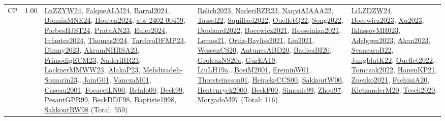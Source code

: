 {\begin{longtable}{p{3cm}r>{\raggedright\arraybackslash}p{6cm}>{\raggedright\arraybackslash}p{6cm}>{\raggedright\arraybackslash}p{8cm}}
\index{CP}\index{CP!CP}CP &  1.00 & \hyperref[detail:LuZZYW24]{LuZZYW24}, \hyperref[detail:FalqueALM24]{FalqueALM24}, \hyperref[detail:Barral2024]{Barral2024}, \hyperref[detail:BonninMNE24]{BonninMNE24}, \hyperref[detail:Houten2024]{Houten2024}, \hyperref[detail:abs-2402-00459]{abs-2402-00459}, \hyperref[detail:ForbesHJST24]{ForbesHJST24}, \hyperref[detail:PrataAN23]{PrataAN23}, \hyperref[detail:Euler2024]{Euler2024}, \hyperref[detail:Infantes2024]{Infantes2024}, \hyperref[detail:Thomas2024]{Thomas2024}, \hyperref[detail:TardivoDFMP23]{TardivoDFMP23}, \hyperref[detail:Dimny2023]{Dimny2023}, \hyperref[detail:AkramNHRSA23]{AkramNHRSA23}, \hyperref[detail:FrimodigECM23]{FrimodigECM23}, \hyperref[detail:NaderiRR23]{NaderiRR23}, \hyperref[detail:LacknerMMWW23]{LacknerMMWW23}, \hyperref[detail:AlakaP23]{AlakaP23}, \hyperref[detail:Mehdizadeh-Somarin23]{Mehdizadeh-Somarin23}...\hyperref[detail:JainG01]{JainG01}, \hyperref[detail:VanczaM01]{VanczaM01}, \hyperref[detail:Caseau2001]{Caseau2001}, \hyperref[detail:FocacciLN00]{FocacciLN00}, \hyperref[detail:Refalo00]{Refalo00}, \hyperref[detail:Beck99]{Beck99}, \hyperref[detail:PesantGPR99]{PesantGPR99}, \hyperref[detail:BeckDDF98]{BeckDDF98}, \hyperref[detail:Baptiste1998]{Baptiste1998}, \hyperref[detail:SakkoutRW98]{SakkoutRW98} (Total: 559) & \hyperref[detail:Relich2023]{Relich2023}, \hyperref[detail:NaderiBZR23]{NaderiBZR23}, \hyperref[detail:NaqviAIAAA22]{NaqviAIAAA22}, \hyperref[detail:Tassel22]{Tassel22}, \hyperref[detail:Squillaci2022]{Squillaci2022}, \hyperref[detail:OuelletQ22]{OuelletQ22}, \hyperref[detail:Song2022]{Song2022}, \hyperref[detail:Doolaard2022]{Doolaard2022}, \hyperref[detail:Bocewicz2021]{Bocewicz2021}, \hyperref[detail:Hosseinian2021]{Hosseinian2021}, \hyperref[detail:Lemos21]{Lemos21}, \hyperref[detail:Ortiz-Bayliss2021]{Ortiz-Bayliss2021}, \hyperref[detail:Liu2021]{Liu2021}, \hyperref[detail:WessenCS20]{WessenCS20}, \hyperref[detail:AntunesABD20]{AntunesABD20}, \hyperref[detail:BadicaBI20]{BadicaBI20}, \hyperref[detail:GroleazNS20a]{GroleazNS20a}, \hyperref[detail:GurEA19]{GurEA19}, \hyperref[detail:LiuLH19a]{LiuLH19a}...\hyperref[detail:BosiM2001]{BosiM2001}, \hyperref[detail:EreminW01]{EreminW01}, \hyperref[detail:Thorsteinsson01]{Thorsteinsson01}, \hyperref[detail:HeipckeCCS00]{HeipckeCCS00}, \hyperref[detail:SakkoutW00]{SakkoutW00}, \hyperref[detail:Hentenryck2000]{Hentenryck2000}, \hyperref[detail:BeckF00]{BeckF00}, \hyperref[detail:Simonis99]{Simonis99}, \hyperref[detail:Zhou97]{Zhou97}, \hyperref[detail:MorgadoM97]{MorgadoM97} (Total: 116) & \hyperref[detail:LiLZDZW24]{LiLZDZW24}, \hyperref[detail:Bocewicz2023]{Bocewicz2023}, \hyperref[detail:Xu2023]{Xu2023}, \hyperref[detail:IklassovMR023]{IklassovMR023}, \hyperref[detail:Adelgren2023]{Adelgren2023}, \hyperref[detail:Akan2023]{Akan2023}, \hyperref[detail:SvancaraB22]{SvancaraB22}, \hyperref[detail:JungblutK22]{JungblutK22}, \hyperref[detail:Ouellet2022]{Ouellet2022}, \hyperref[detail:Tomczak2022]{Tomczak2022}, \hyperref[detail:HanenKP21]{HanenKP21}, \hyperref[detail:Zuenko2021]{Zuenko2021}, \hyperref[detail:FachiniA20]{FachiniA20}, \hyperref[detail:KletzanderM20]{KletzanderM20}, \hyperref[detail:Tesch2020]{Tesch2020}, 
\end{longtable}}
